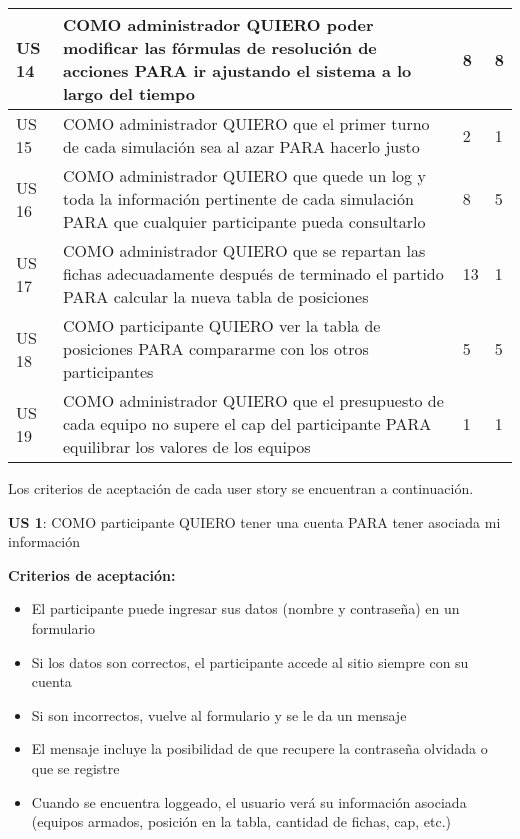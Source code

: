 \begin{center}
\begin{tabular}{| l | p{10cm} | l | l | }
US 14 & COMO administrador QUIERO poder modificar las fórmulas de resolución de acciones PARA ir ajustando el sistema a lo largo del tiempo & 8 & 8\\  \hline
US 15 & COMO administrador QUIERO que el primer turno de cada simulación sea al azar PARA hacerlo justo & 2 & 1\\  \hline
US 16 & COMO administrador QUIERO que quede un log y toda la información pertinente de cada simulación PARA que cualquier participante pueda consultarlo & 8 & 5\\  \hline
US 17 & COMO administrador QUIERO que se repartan las fichas adecuadamente después de terminado el partido PARA calcular la nueva tabla de posiciones & 13 & 1\\  \hline
US 18 & COMO participante QUIERO ver la tabla de posiciones PARA compararme con los otros participantes & 5 & 5\\  \hline
US 19 & COMO administrador QUIERO que el presupuesto de cada equipo no supere el cap del participante PARA equilibrar los valores de los equipos & 1 & 1\\  \hline
  \end{tabular}
\end{center}

Los criterios de aceptación de cada user story se encuentran a continuación.


\begin{tcolorbox}
\textbf{US 1}: COMO participante QUIERO tener una cuenta PARA tener asociada mi información

\vline

\textbf{Criterios de aceptación:}
\begin{itemize}
 \item El participante puede ingresar sus datos (nombre y contraseña) en un formulario
 \item Si los datos son correctos, el participante accede al sitio siempre con su cuenta
 \item Si son incorrectos, vuelve al formulario y se le da un mensaje
 \item El mensaje incluye la posibilidad de que recupere la contraseña olvidada o que se registre
 \item Cuando se encuentra loggeado, el usuario verá su información asociada (equipos armados, posición en la tabla, cantidad de fichas, cap, etc.)
\end{itemize}
\end{tcolorbox}
\vspace{10pt}

